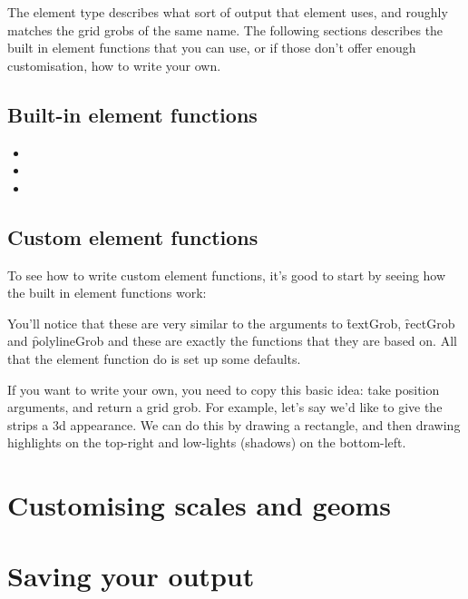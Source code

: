 The element type describes what sort of output that element uses, and roughly matches the grid grobs of the same name.  The following sections describes the built in element functions that you can use, or if those don't offer enough customisation, how to write your own.

\subsection{Built-in element functions}

\begin{itemize}
  \item {}
  \item {}
  \item {}
\end{itemize}

% 
% 

\subsection{Custom element functions}

To see how to write custom element functions, it's good to start by seeing how the built in element functions work:

% 

You'll notice that these are very similar to the arguments to \f{textGrob}, \f{rectGrob} and \f{polylineGrob} and these are exactly the functions that they are based on.  All that the element function do is set up some defaults.  

If you want to write your own, you need to copy this basic idea: take position arguments, and return a grid grob.  For example, let's say we'd like to give the strips a 3d appearance.  We can do this by drawing a rectangle, and then drawing highlights on the top-right and low-lights (shadows) on the bottom-left.


\section{Customising scales and geoms}

\section{Saving your output}
\label{sec:saving}

